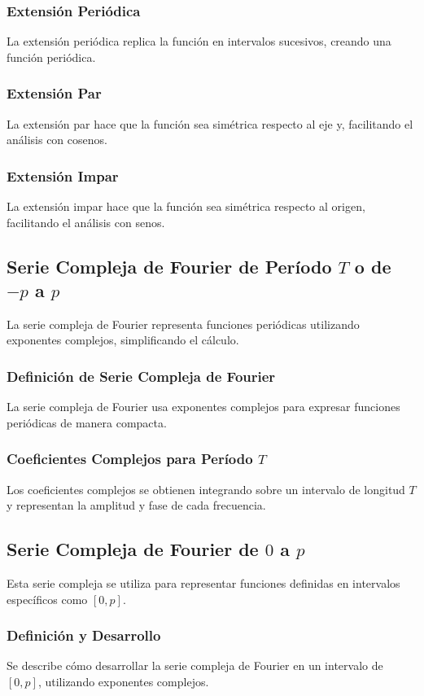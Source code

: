 \subsubsection{Extensión Periódica}
La extensión periódica replica la función en intervalos sucesivos, creando una función periódica.

\subsubsection{Extensión Par}
La extensión par hace que la función sea simétrica respecto al eje y, facilitando el análisis con cosenos.

\subsubsection{Extensión Impar}
La extensión impar hace que la función sea simétrica respecto al origen, facilitando el análisis con senos.

\subsection{Serie Compleja de Fourier de Período $T$ o de $-p$ a $p$}
La serie compleja de Fourier representa funciones periódicas utilizando exponentes complejos, simplificando el cálculo.

\subsubsection{Definición de Serie Compleja de Fourier}
La serie compleja de Fourier usa exponentes complejos para expresar funciones periódicas de manera compacta.

\subsubsection{Coeficientes Complejos para Período $T$}
Los coeficientes complejos se obtienen integrando sobre un intervalo de longitud $T$ y representan la amplitud y fase de cada frecuencia.

\subsection{Serie Compleja de Fourier de $0$ a $p$}
Esta serie compleja se utiliza para representar funciones definidas en intervalos específicos como $[0, p]$.

\subsubsection{Definición y Desarrollo}
Se describe cómo desarrollar la serie compleja de Fourier en un intervalo de $[0, p]$, utilizando exponentes complejos.

